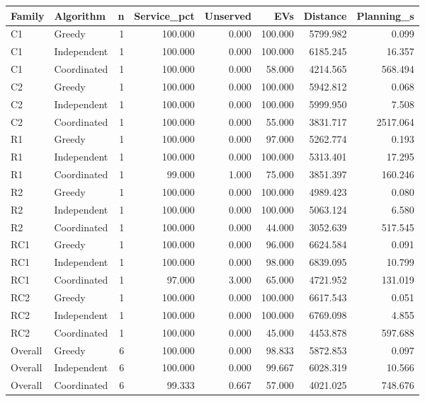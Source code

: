 \begin{tabular}{llrrrrrr}
\toprule
Family & Algorithm & n & Service\_pct & Unserved & EVs & Distance & Planning\_s \\
\midrule
C1 & Greedy & 1 & 100.000 & 0.000 & 100.000 & 5799.982 & 0.099 \\
C1 & Independent & 1 & 100.000 & 0.000 & 100.000 & 6185.245 & 16.357 \\
C1 & Coordinated & 1 & 100.000 & 0.000 & 58.000 & 4214.565 & 568.494 \\
C2 & Greedy & 1 & 100.000 & 0.000 & 100.000 & 5942.812 & 0.068 \\
C2 & Independent & 1 & 100.000 & 0.000 & 100.000 & 5999.950 & 7.508 \\
C2 & Coordinated & 1 & 100.000 & 0.000 & 55.000 & 3831.717 & 2517.064 \\
R1 & Greedy & 1 & 100.000 & 0.000 & 97.000 & 5262.774 & 0.193 \\
R1 & Independent & 1 & 100.000 & 0.000 & 100.000 & 5313.401 & 17.295 \\
R1 & Coordinated & 1 & 99.000 & 1.000 & 75.000 & 3851.397 & 160.246 \\
R2 & Greedy & 1 & 100.000 & 0.000 & 100.000 & 4989.423 & 0.080 \\
R2 & Independent & 1 & 100.000 & 0.000 & 100.000 & 5063.124 & 6.580 \\
R2 & Coordinated & 1 & 100.000 & 0.000 & 44.000 & 3052.639 & 517.545 \\
RC1 & Greedy & 1 & 100.000 & 0.000 & 96.000 & 6624.584 & 0.091 \\
RC1 & Independent & 1 & 100.000 & 0.000 & 98.000 & 6839.095 & 10.799 \\
RC1 & Coordinated & 1 & 97.000 & 3.000 & 65.000 & 4721.952 & 131.019 \\
RC2 & Greedy & 1 & 100.000 & 0.000 & 100.000 & 6617.543 & 0.051 \\
RC2 & Independent & 1 & 100.000 & 0.000 & 100.000 & 6769.098 & 4.855 \\
RC2 & Coordinated & 1 & 100.000 & 0.000 & 45.000 & 4453.878 & 597.688 \\
Overall & Greedy & 6 & 100.000 & 0.000 & 98.833 & 5872.853 & 0.097 \\
Overall & Independent & 6 & 100.000 & 0.000 & 99.667 & 6028.319 & 10.566 \\
Overall & Coordinated & 6 & 99.333 & 0.667 & 57.000 & 4021.025 & 748.676 \\
\bottomrule
\end{tabular}
